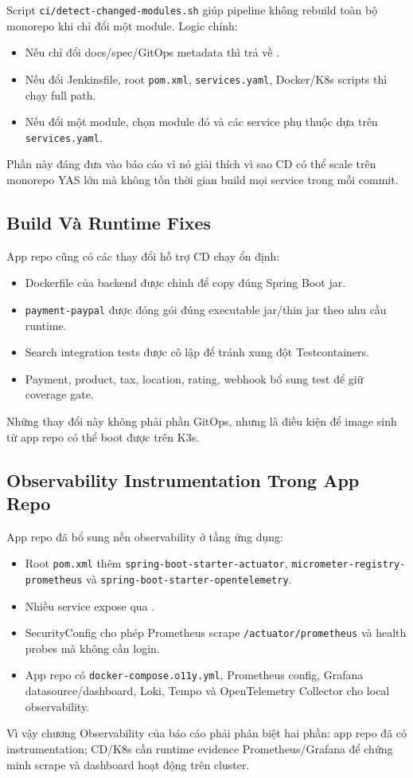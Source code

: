 Script \texttt{ci/detect-changed-modules.sh} giúp pipeline không rebuild toàn bộ
monorepo khi chỉ đổi một module. Logic chính:

\begin{itemize}
    \item Nếu chỉ đổi docs/spec/GitOps metadata thì trả về .
    \item Nếu đổi Jenkinsfile, root \texttt{pom.xml}, \texttt{services.yaml}, Docker/K8s scripts thì chạy full path.
    \item Nếu đổi một module, chọn module đó và các service phụ thuộc dựa trên \texttt{services.yaml}.
\end{itemize}

Phần này đáng đưa vào báo cáo vì nó giải thích vì sao CD có thể scale trên monorepo
YAS lớn mà không tốn thời gian build mọi service trong mỗi commit.

\subsection{Build Và Runtime Fixes}

App repo cũng có các thay đổi hỗ trợ CD chạy ổn định:

\begin{itemize}
    \item Dockerfile của backend được chỉnh để copy đúng Spring Boot jar.
    \item \texttt{payment-paypal} được đóng gói đúng executable jar/thin jar theo nhu cầu runtime.
    \item Search integration tests được cô lập để tránh xung đột Testcontainers.
    \item Payment, product, tax, location, rating, webhook bổ sung test để giữ coverage gate.
\end{itemize}

Những thay đổi này không phải phần GitOps, nhưng là điều kiện để image sinh từ app
repo có thể boot được trên K3s.

\subsection{Observability Instrumentation Trong App Repo}

App repo đã bổ sung nền observability ở tầng ứng dụng:

\begin{itemize}
    \item Root \texttt{pom.xml} thêm \texttt{spring-boot-starter-actuator},
    \texttt{micrometer-registry-prometheus} và \texttt{spring-boot-starter-opentelemetry}.
    \item Nhiều service expose  qua
    .
    \item SecurityConfig cho phép Prometheus scrape \texttt{/actuator/prometheus}
    và health probes mà không cần login.
    \item App repo có \texttt{docker-compose.o11y.yml}, Prometheus config, Grafana
    datasource/dashboard, Loki, Tempo và OpenTelemetry Collector cho local observability.
\end{itemize}

Vì vậy chương Observability của báo cáo phải phân biệt hai phần: app repo đã có
instrumentation; CD/K8s cần runtime evidence Prometheus/Grafana để chứng minh scrape
và dashboard hoạt động trên cluster.
